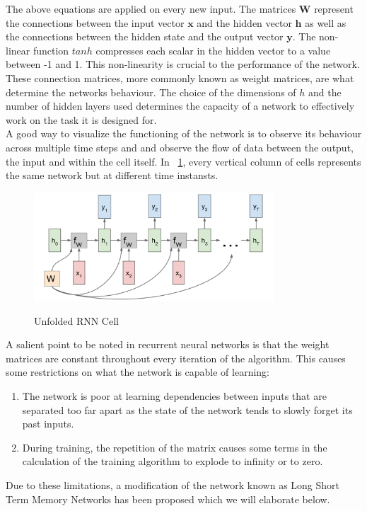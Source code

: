 The above equations are applied on every new input. The matrices $\mathbf{W}$ represent the connections between the input vector $\mathbf{x}$ and the hidden vector $\mathbf{h}$ as well as the connections between the hidden state and the output vector $\mathbf{y}$. The non-linear function $tanh$ compresses each scalar in the hidden vector to a value between -1 and 1. This non-linearity is crucial to the performance of the network. \\
These connection matrices, more commonly known as weight matrices, are what determine the networks behaviour. The choice of the dimensions of $h$ and the number of hidden layers used determines the capacity of a network to effectively work on the task it is designed for. \\
A good way to visualize the functioning of the network is to observe its behaviour across multiple time steps and and observe the flow of data between the output, the input and within the cell itself. In ~\ref{fig:unroll}, every vertical column of cells represents the same network but at different time instansts.

\begin{figure}[h]
\caption{Unfolded RNN Cell}
\centering
\includegraphics[width=0.8\textwidth]{manyTomany}
\label{fig:unroll}
\end{figure}


A salient point to be noted in recurrent neural networks is that the weight matrices are constant throughout every iteration of the algorithm. This causes some restrictions on what the network is capable of learning:

\begin{enumerate}
    \item The network is poor at learning dependencies between inputs that are separated too far apart as the state of the network tends to slowly forget its past inputs.
    \item During training, the repetition of the matrix causes some terms in the calculation of the training algorithm to explode to infinity or to zero. 
\end{enumerate}
Due to these limitations, a modification of the network known as Long Short Term Memory Networks has been proposed which we will elaborate below.

